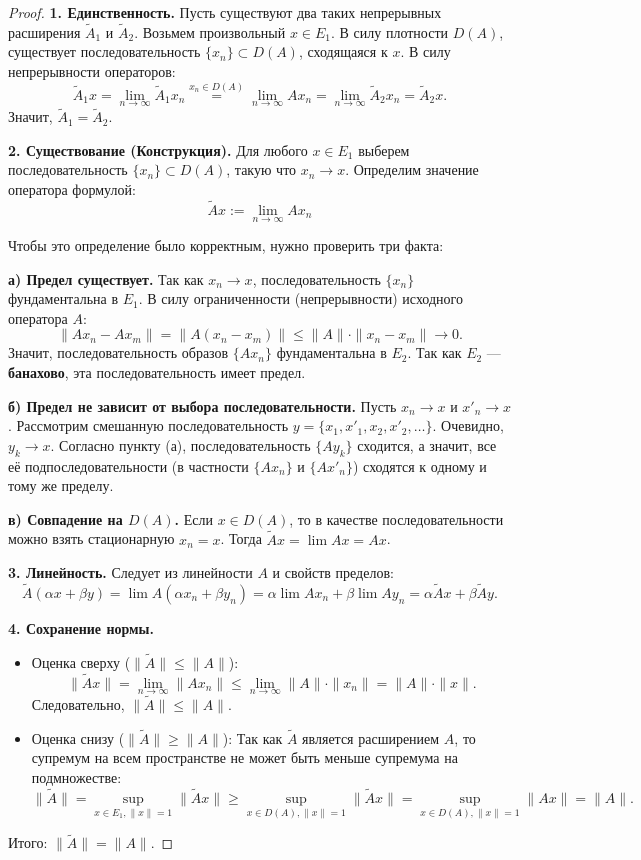 \begin{proof}
	\textbf{1. Единственность.}
	Пусть существуют два таких непрерывных расширения $\widetilde{A}_1$ и $\widetilde{A}_2$.
	Возьмем произвольный $x \in E_1$. В силу плотности $D(A)$, существует последовательность $\{x_n\} \subset D(A)$, сходящаяся к $x$.
	В силу непрерывности операторов:
	\[ \widetilde{A}_1 x = \lim_{n \to \infty} \widetilde{A}_1 x_n \overset{x_n \in D(A)}{=} \lim_{n \to \infty} A x_n = \lim_{n \to \infty} \widetilde{A}_2 x_n = \widetilde{A}_2 x. \]
	Значит, $\widetilde{A}_1 = \widetilde{A}_2$.
	
	\textbf{2. Существование (Конструкция).}
	Для любого $x \in E_1$ выберем последовательность $\{x_n\} \subset D(A)$, такую что $x_n \to x$.
	Определим значение оператора формулой:
	\[ \widetilde{A}x := \lim_{n \to \infty} A x_n \]
	
	Чтобы это определение было корректным, нужно проверить три факта:
	
	\textbf{а) Предел существует.}
	Так как $x_n \to x$, последовательность $\{x_n\}$ фундаментальна в $E_1$.
	В силу ограниченности (непрерывности) исходного оператора $A$:
	\[ \|Ax_n - Ax_m\| = \|A(x_n - x_m)\| \leqslant \|A\| \cdot \|x_n - x_m\| \to 0. \]
	Значит, последовательность образов $\{Ax_n\}$ фундаментальна в $E_2$.
	Так как $E_2$ --- \textbf{банахово}, эта последовательность имеет предел.
	
	
	
	\textbf{б) Предел не зависит от выбора последовательности.}
	Пусть $x_n \to x$ и $x'_n \to x$. Рассмотрим смешанную последовательность $y = \{x_1, x'_1, x_2, x'_2, \dots\}$.
	Очевидно, $y_k \to x$. Согласно пункту (а), последовательность $\{Ay_k\}$ сходится, а значит, все её подпоследовательности (в частности $\{Ax_n\}$ и $\{Ax'_n\}$) сходятся к одному и тому же пределу.
	
	\textbf{в) Совпадение на $D(A)$.}
	Если $x \in D(A)$, то в качестве последовательности можно взять стационарную $x_n = x$.
	Тогда $\widetilde{A}x = \lim Ax = Ax$.
	
	\textbf{3. Линейность.}
	Следует из линейности $A$ и свойств пределов:
	\[ \widetilde{A}(\alpha x + \beta y) = \lim A(\alpha x_n + \beta y_n) = \alpha \lim Ax_n + \beta \lim Ay_n = \alpha \widetilde{A}x + \beta \widetilde{A}y. \]
	
	\textbf{4. Сохранение нормы.}
	\begin{itemize}
		\item Оценка сверху ($\|\widetilde{A}\| \leqslant \|A\|$):
		\[ \|\widetilde{A}x\| = \lim_{n \to \infty} \|Ax_n\| \leqslant \lim_{n \to \infty} \|A\| \cdot \|x_n\| = \|A\| \cdot \|x\|. \]
		Следовательно, $\|\widetilde{A}\| \leqslant \|A\|$.
		\item Оценка снизу ($\|\widetilde{A}\| \geqslant \|A\|$):
		Так как $\widetilde{A}$ является расширением $A$, то супремум на всем пространстве не может быть меньше супремума на подмножестве:
		\[ \|\widetilde{A}\| = \sup_{x \in E_1, \|x\|=1} \|\widetilde{A}x\| \geqslant \sup_{x \in D(A), \|x\|=1} \|\widetilde{A}x\| = \sup_{x \in D(A), \|x\|=1} \|Ax\| = \|A\|. \]
	\end{itemize}
	Итого: $\|\widetilde{A}\| = \|A\|$.
\end{proof}